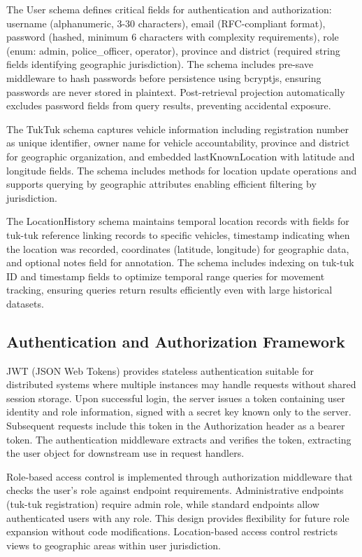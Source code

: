 \documentclass[12pt,a4paper]{article}
\begin{document}
The User schema defines critical fields for authentication and authorization: username (alphanumeric, 3-30 characters), email (RFC-compliant format), password (hashed, minimum 6 characters with complexity requirements), role (enum: admin, police\_officer, operator), province and district (required string fields identifying geographic jurisdiction). The schema includes pre-save middleware to hash passwords before persistence using bcryptjs, ensuring passwords are never stored in plaintext. Post-retrieval projection automatically excludes password fields from query results, preventing accidental exposure.

The TukTuk schema captures vehicle information including registration number as unique identifier, owner name for vehicle accountability, province and district for geographic organization, and embedded lastKnownLocation with latitude and longitude fields. The schema includes methods for location update operations and supports querying by geographic attributes enabling efficient filtering by jurisdiction.

The LocationHistory schema maintains temporal location records with fields for tuk-tuk reference linking records to specific vehicles, timestamp indicating when the location was recorded, coordinates (latitude, longitude) for geographic data, and optional notes field for annotation. The schema includes indexing on tuk-tuk ID and timestamp fields to optimize temporal range queries for movement tracking, ensuring queries return results efficiently even with large historical datasets.

\subsection{Authentication and Authorization Framework}

JWT (JSON Web Tokens) provides stateless authentication suitable for distributed systems where multiple instances may handle requests without shared session storage. Upon successful login, the server issues a token containing user identity and role information, signed with a secret key known only to the server. Subsequent requests include this token in the Authorization header as a bearer token. The authentication middleware extracts and verifies the token, extracting the user object for downstream use in request handlers.

Role-based access control is implemented through authorization middleware that checks the user's role against endpoint requirements. Administrative endpoints (tuk-tuk registration) require admin role, while standard endpoints allow authenticated users with any role. This design provides flexibility for future role expansion without code modifications. Location-based access control restricts views to geographic areas within user jurisdiction.
\end{document}
